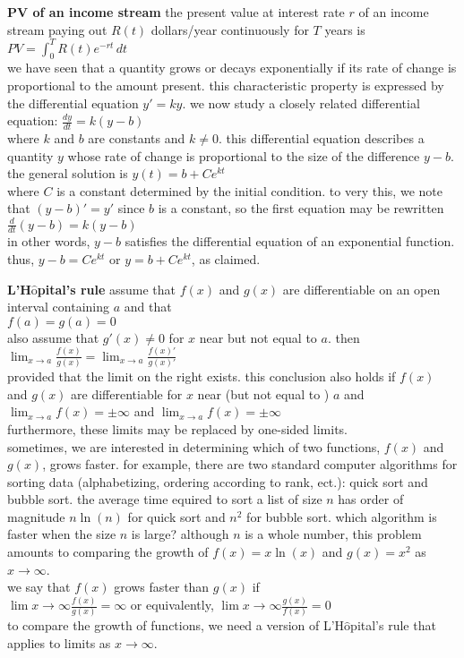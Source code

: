 \documentclass{article}
\begin{document}
\textbf{PV of an income stream} the present value at interest rate $r$ of an income stream paying out $R(t)$ dollars/year continuously for $T$ years is $PV = \int_{0}^{T}R(t)e^{-rt}\,dt$\\

we have seen that a quantity grows or decays exponentially if its rate of change is proportional to the amount present. this characteristic property is expressed by the differential equation $y' = ky$. we now study a closely related differential equation: $\frac{dy}{dt} = k(y - b)$\\ where $k$ and $b$ are constants and $k \neq 0$. this differential equation describes a quantity $y$ whose rate of change is proportional to the size of the difference $y - b$. the general solution is $y(t) = b + Ce^{kt}$\\ where $C$ is a constant determined by the initial condition. to very this, we note that $(y - b)' = y'$ since $b$ is a constant, so the first equation may be rewritten $\frac{d}{dt}(y - b) = k(y - b)$\\ in other words, $y - b$ satisfies the differential equation of an exponential function. thus, $y - b = Ce^{kt}$ or $y = b + Ce^{kt}$, as claimed.

\textbf{L'H$\hat{\text{o}}$pital's rule} assume that $f(x)$ and $g(x)$ are differentiable on an open interval containing $a$ and that\\ $f(a) = g(a) = 0$\\ also assume that $g'(x) \neq 0$ for $x$ near but not equal to $a$. then\\ $\lim_{x \to a}\frac{f(x)}{g(x)} = \lim_{x \to a}\frac{f(x)'}{g(x)'}$\\ provided that the limit on the right exists. this conclusion also holds if $f(x)$ and $g(x)$ are differentiable for $x$ near (but not equal to ) $a$ and\\ $\lim_{x \to a}f(x) = \pm\infty$ and $\lim_{x \to a}f(x) = \pm\infty$\\ furthermore, these limits may be replaced by one-sided limits.\\

sometimes, we are interested in determining which of two functions, $f(x)$ and $g(x)$, grows faster. for example, there are two standard computer algorithms for sorting data (alphabetizing, ordering according to rank, ect.): quick sort and bubble sort. the average time equired to sort a list of size $n$ has order of magnitude $n\ln(n)$ for quick sort and $n^2$ for bubble sort. which algorithm is faster when the size $n$ is large? although $n$ is a whole number, this problem amounts to comparing the growth of $f(x) = x\ln(x)$ and $g(x) = x^2$ as $x \to \infty$.\\ we say that $f(x)$ grows faster than $g(x)$ if\\ $\lim{x \to \infty}\frac{f(x)}{g(x)} = \infty$ or equivalently, $\lim{x \to \infty}\frac{g(x)}{f(x)} = 0$\\ to compare the growth of functions, we need a version of L'H$\hat{\text{o}}$pital's rule that applies to limits as $x \to \infty$.\\
\end{document}
